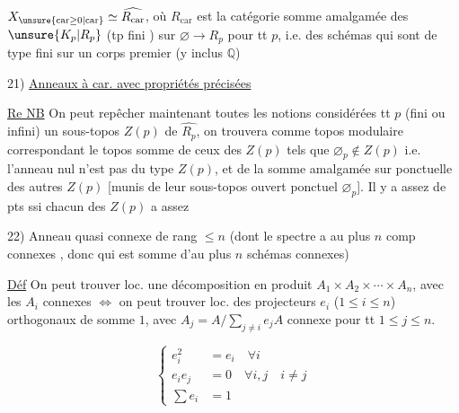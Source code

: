 
$X_{\unsure{\mathrm{car}{\geq}0|\mathrm{car}}}\simeq\widehat{R_{\mathrm{car}}}$, où $R_{\mathrm{car}}$ est la catégorie somme amalgamée des $\unsure{K_p|R_p}$ (tp fini ) sur $\varnothing\longrightarrow R_p$ pour tt $p$, i.e. des schémas  qui sont de type fini sur un corps premier (y inclus $\mathbb Q$) 

21) \uline{Anneaux à car. avec propriétés précisées}

 \uline{Re NB} On peut repêcher maintenant toutes les notions considérées   tt $p$ (fini ou infini) un sous-topos  $Z(p)$ de $\widehat{R_p}$, on trouvera comme topos modulaire correspondant le topos somme de ceux des $Z(p)$ tels que $\varnothing_p\notin Z(p)$ i.e. l'anneau nul  n'est pas  du type $Z(p)$, et de la somme amalgamée sur   ponctuelle des autres $Z(p)$ [munis de leur sous-topos ouvert ponctuel $\varnothing_p$]. Il y a assez de pts ssi chacun des $Z(p)$  a assez

22) Anneau quasi  connexe de rang $\leq n$ (dont le spectre a au plus $n$ comp connexes , donc qui est somme d'au plus $n$ schémas connexes)

 \uline{Déf} On peut trouver loc. une décomposition en produit $A_1\times A_2\times\cdots\times A_n$, avec les $A_i$ connexes $\Longleftrightarrow$ on peut trouver loc.  des projecteurs $e_i$ ($1\leq i\leq n$) orthogonaux de somme $1$, avec $A_j=A/\sum_{j\ne i}e_j A$ connexe pour tt $1\leq j\leq n$.


\[
 \left\{\begin{aligned}
 e_i^2&=e_i\quad\forall i\\
 e_i e_j&=0\quad\forall i,j\quad i\ne j\\
 \sum e_i&=1
 \end{aligned}\right.
\]

